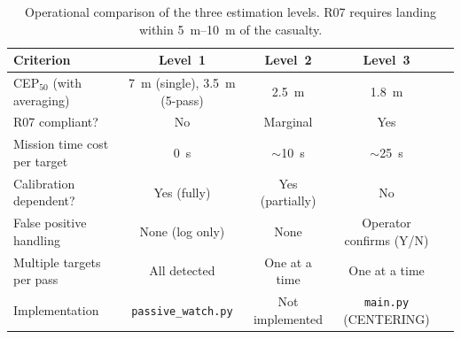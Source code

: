 \begin{table}[H]
  \centering
  \caption{Operational comparison of the three estimation levels.  R07 requires landing within \SIrange{5}{10}{\metre} of the casualty.}
  \label{tab:level-comparison-ops}
  \begin{tabularx}{\linewidth}{Xcccc}
    \toprule
    \textbf{Criterion} & \textbf{Level~1} & \textbf{Level~2} & \textbf{Level~3} \\
    \midrule
    CEP$_{50}$ (with averaging)    & \SI{7}{\metre} (single), \SI{3.5}{\metre} (5-pass) & \SI{2.5}{\metre} & \SI{1.8}{\metre} \\
    R07 compliant?                 & No              & Marginal         & Yes \\
    Mission time cost per target   & \SI{0}{\second}  & $\sim$\SI{10}{\second} & $\sim$\SI{25}{\second} \\
    Calibration dependent?         & Yes (fully)      & Yes (partially)  & No \\
    False positive handling        & None (log only)  & None             & Operator confirms (Y/N) \\
    Multiple targets per pass      & All detected     & One at a time    & One at a time \\
    Implementation                 & \texttt{passive\_watch.py} & Not implemented & \texttt{main.py} (CENTERING) \\
    \bottomrule
  \end{tabularx}
\end{table}

